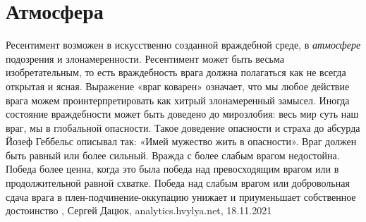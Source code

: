  
 
 
 
 
\chapter{Атмосфера}
\label{sec:slova.atmosfera}

Ресентимент возможен в искусственно созданной враждебной среде, в
\emph{атмосфере} подозрения и злонамеренности. Ресентимент может быть весьма
изобретательным, то есть враждебность врага должна полагаться как не всегда
открытая и ясная.  Выражение «враг коварен» означает, что мы любое действие
врага можем проинтерпретировать как хитрый злонамеренный замысел.  Иногда
состояние враждебности может быть доведено до мирозлобия: весь мир суть наш
враг, мы в глобальной опасности. Такое доведение опасности и страха до абсурда
Йозеф Геббельс описывал так: «Имей мужество жить в опасности».  Враг должен
быть равный или более сильный. Вражда с более слабым врагом недостойна. Победа
более ценна, когда это была победа над превосходящим врагом или в
продолжительной равной схватке. Победа над слабым врагом или добровольная сдача
врага в плен-подчинение-оккупацию унижает и приуменьшает собственное
достоинство
, Сергей Дацюк, analytics.hvylya.net, 18.11.2021
